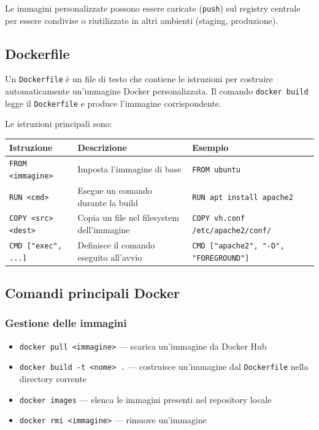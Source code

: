 \documentclass{article}
\begin{document}
Le immagini personalizzate possono essere caricate (\texttt{push}) sul registry centrale per essere condivise o riutilizzate in altri ambienti (staging, produzione).

\subsection*{Dockerfile}

Un \texttt{Dockerfile} è un file di testo che contiene le istruzioni per costruire automaticamente un'immagine Docker personalizzata. Il comando \texttt{docker build} legge il \texttt{Dockerfile} e produce l'immagine corrispondente.

Le istruzioni principali sono:

\begin{center}
\begin{tabular}{|l|l|l|}
\hline
\textbf{Istruzione} & \textbf{Descrizione} & \textbf{Esempio} \\
\hline
\texttt{FROM <immagine>} & Imposta l'immagine di base & \texttt{FROM ubuntu} \\
\texttt{RUN <cmd>} & Esegue un comando durante la build & \texttt{RUN apt install apache2} \\
\texttt{COPY <src> <dest>} & Copia un file nel filesystem dell'immagine & \texttt{COPY vh.conf /etc/apache2/conf/} \\
\texttt{CMD ["exec", ...]} & Definisce il comando eseguito all'avvio & \texttt{CMD ["apache2", "-D", "FOREGROUND"]} \\
\hline
\end{tabular}
\end{center}

\subsection*{Comandi principali Docker}

\subsubsection*{Gestione delle immagini}
\begin{itemize}
    \item \texttt{docker pull <immagine>} --- scarica un'immagine da Docker Hub
    \item \texttt{docker build -t <nome> .} --- costruisce un'immagine dal \texttt{Dockerfile} nella directory corrente
    \item \texttt{docker images} --- elenca le immagini presenti nel repository locale
    \item \texttt{docker rmi <immagine>} --- rimuove un'immagine
\end{itemize}
\end{document}
